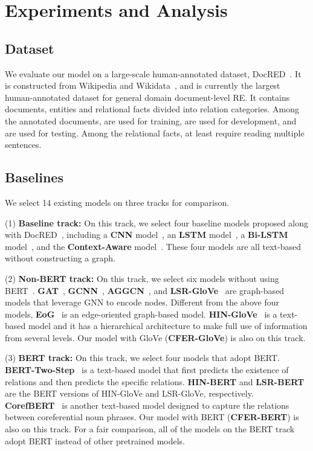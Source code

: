 \documentclass[letterpaper]{article} \usepackage{aaai21}  \usepackage{times}  \usepackage{helvet} \usepackage{courier}  \usepackage[hyphens]{url}  \usepackage{graphicx} \urlstyle{rm} \def\UrlFont{\rm}  \usepackage{natbib}  \usepackage{caption} \frenchspacing  \setlength{\pdfpagewidth}{8.5in}  \setlength{\pdfpageheight}{11in}
\begin{document}
\section{Experiments and Analysis}

\subsection{Dataset}
We evaluate our model on a large-scale human-annotated dataset, DocRED~\citep{docred}. 
It is constructed from Wikipedia and Wikidata~\citep{wikidata}, and is currently the largest human-annotated dataset for general domain document-level RE. 
It contains  documents,  entities and  relational facts divided into  relation categories. 
Among the annotated documents,  are used for training,  are used for development, and  are used for testing. 
Among the relational facts, at least  require reading multiple sentences. 

\subsection{Baselines}
We select 14 existing models on three tracks for comparison. 

\noindent(1) \textbf{Baseline track:}
On this track, we select four baseline models proposed along with DocRED~\citep{docred}, including a \textbf{CNN} model~\citep{baseline_cnn}, an \textbf{LSTM} model~\citep{lstm}, a \textbf{Bi-LSTM} model~\citep{baseline_bilstm}, and the \textbf{Context-Aware} model~\citep{baseline_context_aware}. 
These four models are all text-based without constructing a graph. 

\noindent(2) \textbf{Non-BERT track:}
On this track, we select six models without using BERT~\citep{bert}. 
\textbf{GAT}~\citep{gat}, \textbf{GCNN}~\citep{gcnn}, \textbf{AGGCN}~\citep{aggcn}, and \textbf{LSR-GloVe}~\citep{lsr} are graph-based models that leverage GNN to encode nodes. 
Different from the above four models, \textbf{EoG}~\citep{eog} is an edge-oriented graph-based model. 
\textbf{HIN-GloVe}~\citep{hin} is a text-based model and it has a hierarchical architecture to make full use of information from several levels. 
Our model with GloVe (\textbf{CFER-GloVe}) is also on this track. 

\noindent(3) \textbf{BERT track:}
On this track, we select four models that adopt BERT. 
\textbf{BERT-Two-Step}~\citep{bert_two_step} is a text-based model that first predicts the existence of relations and then predicts the specific relations. 
\textbf{HIN-BERT} and \textbf{LSR-BERT} are the BERT versions of HIN-GloVe and LSR-GloVe, respectively. 
\textbf{CorefBERT}~\citep{coref_bert} is another text-based model designed to capture the relations between coreferential noun phrases. 
Our model with BERT (\textbf{CFER-BERT}) is also on this track. 
For a fair comparison, all of the models on the BERT track adopt BERT instead of other pretrained models. 
\end{document}
